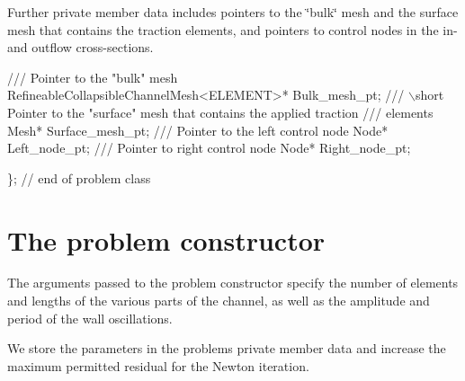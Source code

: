 Further private member data includes pointers to the \char`\"{}bulk\char`\"{} mesh and the surface mesh that contains the traction elements, and pointers to control nodes in the in-\/ and outflow cross-\/sections.


\begin{DoxyCodeInclude}
 \textcolor{comment}{}
\textcolor{comment}{ /// Pointer to the "bulk" mesh}
\textcolor{comment}{} RefineableCollapsibleChannelMesh<ELEMENT>* Bulk\_mesh\_pt;
 \textcolor{comment}{}
\textcolor{comment}{ /// \(\backslash\)short Pointer to the "surface" mesh that contains the applied traction}
\textcolor{comment}{ /// elements}
\textcolor{comment}{} Mesh* Surface\_mesh\_pt; 
 \textcolor{comment}{}
\textcolor{comment}{ /// Pointer to the left control node}
\textcolor{comment}{} Node* Left\_node\_pt;
 \textcolor{comment}{}
\textcolor{comment}{ /// Pointer to right control node}
\textcolor{comment}{} Node* Right\_node\_pt;
  
\}; \textcolor{comment}{// end of problem class}

\end{DoxyCodeInclude}




 

\hypertarget{index_problemcontr}{}\section{The problem constructor}\label{index_problemcontr}
The arguments passed to the problem constructor specify the number of elements and lengths of the various parts of the channel, as well as the amplitude and period of the wall oscillations.

We store the parameters in the problem\textquotesingle{}s private member data and increase the maximum permitted residual for the Newton iteration.

